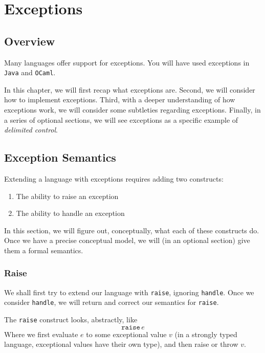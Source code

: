 \chapter{Exceptions}\label{chapter:exceptions}

\section{Overview}
Many languages offer support for exceptions. You will have used exceptions in \texttt{Java} and \texttt{OCaml}.

In this chapter, we will first recap what exceptions are. Second, we will consider how to implement exceptions. Third, with a deeper understanding of how exceptions work, we will consider some subtleties regarding exceptions. Finally, in a series of optional sections, we will see exceptions as a specific example of \textit{delimited control}.

\section{Exception Semantics}
Extending a language with exceptions requires adding two constructs: 
\begin{enumerate}
    \item The ability to raise an exception
    \item The ability to handle an exception
\end{enumerate}

In this section, we will figure out, conceptually, what each of these constructs do. Once we have a precise conceptual model, we will (in an optional section) give them a formal semantics. 

\subsection{Raise}
We shall first try to extend our language with \texttt{raise}, ignoring \texttt{handle}. Once we consider \texttt{handle}, we will return and correct our semantics for \texttt{raise}.

The \texttt{raise} construct looks, abstractly, like
\[\texttt{raise}\, e\]
Where we first evaluate $e$ to some exceptional value $v$ (in a strongly typed language, exceptional values have their own type), and then raise or throw $v$.

